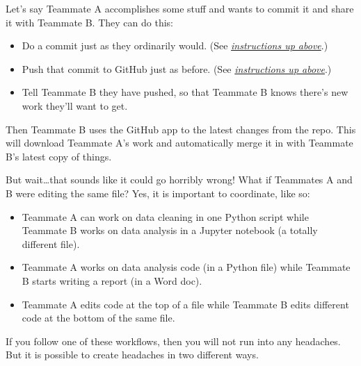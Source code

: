 \documentclass[letterpaper,10pt,english]{jupyterBook}
\begin{document}
\sphinxAtStartPar
Let’s say Teammate A accomplishes some stuff and wants to commit it and share it with Teammate B.  They can do this:
\begin{itemize}
\item {} 
\sphinxAtStartPar
Do a commit just as they ordinarily would.  (See {\hyperref[\detokenize{chapter-8-version-control:make-a-commit}]{\emph{instructions up above}}}.)

\item {} 
\sphinxAtStartPar
Push that commit to GitHub just as before.  (See {\hyperref[\detokenize{chapter-8-version-control:publish-your-commit}]{\emph{instructions up above}}}.)

\item {} 
\sphinxAtStartPar
Tell Teammate B they have pushed, so that Teammate B knows there’s new work they’ll want to get.

\end{itemize}

\sphinxAtStartPar
Then Teammate B uses the GitHub app to  the latest changes from the repo.  This will download Teammate A’s work and automatically merge it in with Teammate B’s latest copy of things.

\sphinxAtStartPar
But wait…that sounds like it could go horribly wrong!  What if Teammates A and B were editing the same file?  Yes, it is important to coordinate, like so:

\sphinxAtStartPar
{}
\begin{itemize}
\item {} 
\sphinxAtStartPar
Teammate A can work on data cleaning in one Python script while Teammate B works on data analysis in a Jupyter notebook (a totally different file).

\item {} 
\sphinxAtStartPar
Teammate A works on data analysis code (in a Python file) while Teammate B starts writing a report (in a Word doc).

\item {} 
\sphinxAtStartPar
Teammate A edits code at the top of a file while Teammate B edits different code at the bottom of the same file.

\end{itemize}

\sphinxAtStartPar
If you follow one of these workflows, then you will not run into any headaches.  But it is possible to create headaches in two different ways.
\end{document}
